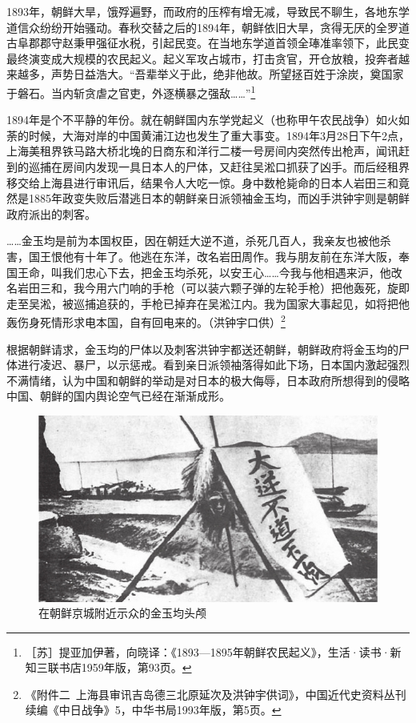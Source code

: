 \documentclass[12pt,UTF8]{ctexbook}
\begin{document}
1893年，朝鲜大旱，饿殍遍野，而政府的压榨有增无减，导致民不聊生，各地东学道信众纷纷开始骚动。春秋交替之后的1894年，朝鲜依旧大旱，贪得无厌的全罗道古阜郡郡守赵秉甲强征水税，引起民变。在当地东学道首领全琫准率领下，此民变最终演变成大规模的农民起义。起义军攻占城市，打击贪官，开仓放粮，投奔者越来越多，声势日益浩大。“吾辈举义于此，绝非他故。所望拯百姓于涂炭，奠国家于磐石。当内斩贪虐之官吏，外逐横暴之强敌……”\footnote{［苏］提亚加伊著，向晓译：《1893—1895年朝鲜农民起义》，生活·读书·新知三联书店1959年版，第93页。}

1894年是个不平静的年份。就在朝鲜国内东学党起义（也称甲午农民战争）如火如荼的时候，大海对岸的中国黄浦江边也发生了重大事变。1894年3月28日下午2点，上海美租界铁马路大桥北堍的日商东和洋行二楼一号房间内突然传出枪声，闻讯赶到的巡捕在房间内发现一具日本人的尸体，又赶往吴淞口抓获了凶手。而后经租界移交给上海县进行审讯后，结果令人大吃一惊。身中数枪毙命的日本人岩田三和竟然是1885年政变失败后潜逃日本的朝鲜亲日派领袖金玉均，而凶手洪钟宇则是朝鲜政府派出的刺客。

……金玉均是前为本国权臣，因在朝廷大逆不道，杀死几百人，我亲友也被他杀害，国王恨他有十年了。他逃在东洋，改名岩田周作。我与朋友前在东洋大阪，奉国王命，叫我们忠心下去，把金玉均杀死，以安王心……今我与他相遇来沪，他改名岩田三和，我今用六门响的手枪（可以装六颗子弹的左轮手枪）把他轰死，旋即走至吴淞，被巡捕追获的，手枪已掉弃在吴淞江内。我为国家大事起见，如将把他轰伤身死情形求电本国，自有回电来的。（洪钟宇口供）\footnote{《附件二\ 上海县审讯吉岛德三北原延次及洪钟宇供词》，中国近代史资料丛刊续编《中日战争》5，中华书局1993年版，第5页。}

根据朝鲜请求，金玉均的尸体以及刺客洪钟宇都送还朝鲜，朝鲜政府将金玉均的尸体进行凌迟、暴尸，以示惩戒。看到亲日派领袖落得如此下场，日本国内激起强烈不满情绪，认为中国和朝鲜的举动是对日本的极大侮辱，日本政府所想得到的侵略中国、朝鲜的国内舆论空气已经在渐渐成形。

\begin{figure}[htbp]
	\centering
	\includegraphics[width=0.7\linewidth]{7}
	\caption{在朝鲜京城附近示众的金玉均头颅}
	\label{fig:1}
\end{figure}
\end{document}
